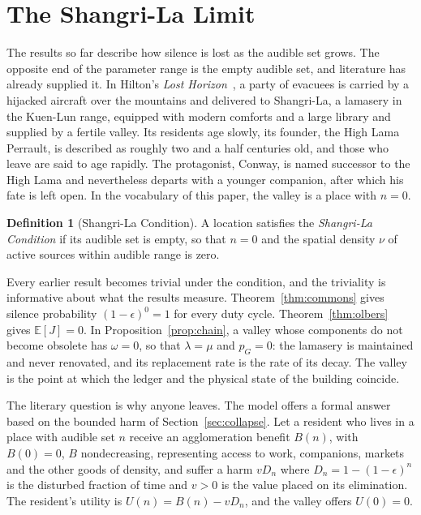 \documentclass[11pt]{article}
\theoremstyle{definition}
\newtheorem{definition}[theorem]{Definition}
\theoremstyle{remark}
\newcommand{\E}{\mathbb{E}}
\begin{document}
\section{The Shangri-La Limit}\label{sec:shangri}

The results so far describe how silence is lost as the audible set grows. The opposite end of the parameter range is the empty audible set, and literature has already supplied it. In Hilton's \emph{Lost Horizon}~\cite{hilton}, a party of evacuees is carried by a hijacked aircraft over the mountains and delivered to Shangri-La, a lamasery in the Kuen-Lun range, equipped with modern comforts and a large library and supplied by a fertile valley. Its residents age slowly, its founder, the High Lama Perrault, is described as roughly two and a half centuries old, and those who leave are said to age rapidly. The protagonist, Conway, is named successor to the High Lama and nevertheless departs with a younger companion, after which his fate is left open. In the vocabulary of this paper, the valley is a place with $n=0$.

\begin{definition}[Shangri-La Condition]
A location satisfies the \emph{Shangri-La Condition} if its audible set is empty, so that $n=0$ and the spatial density $\nu$ of active sources within audible range is zero.
\end{definition}

Every earlier result becomes trivial under the condition, and the triviality is informative about what the results measure. Theorem~\ref{thm:commons} gives silence probability $(1-\epsilon)^0=1$ for every duty cycle. Theorem~\ref{thm:olbers} gives $\E[J]=0$. In Proposition~\ref{prop:chain}, a valley whose components do not become obsolete has $\omega=0$, so that $\lambda=\mu$ and $p_G=0$: the lamasery is maintained and never renovated, and its replacement rate is the rate of its decay. The valley is the point at which the ledger and the physical state of the building coincide.

The literary question is why anyone leaves. The model offers a formal answer based on the bounded harm of Section~\ref{sec:collapse}. Let a resident who lives in a place with audible set $n$ receive an agglomeration benefit $B(n)$, with $B(0)=0$, $B$ nondecreasing, representing access to work, companions, markets and the other goods of density, and suffer a harm $vD_n$ where $D_n = 1-(1-\epsilon)^n$ is the disturbed fraction of time and $v>0$ is the value placed on its elimination. The resident's utility is $U(n)=B(n)-vD_n$, and the valley offers $U(0)=0$.
\end{document}
